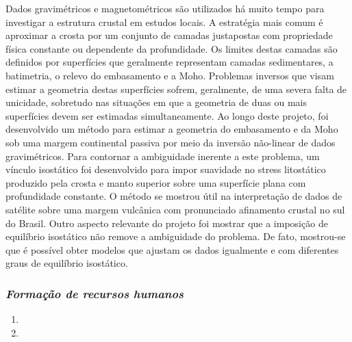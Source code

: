 Dados gravimétricos e magnetométricos são utilizados há muito tempo para investigar 
a estrutura crustal em estudos locais. A estratégia mais comum é aproximar a crosta por 
um conjunto de camadas justapostas com propriedade física constante ou dependente 
da profundidade. Os limites destas camadas são definidos por superfícies que geralmente 
representam camadas sedimentares, a batimetria, o relevo do embasamento e a Moho. 
Problemas inversos que visam estimar a geometria destas superfícies sofrem, geralmente, 
de uma severa falta de unicidade, sobretudo nas situações em que a geometria de duas 
ou mais superfícies devem ser estimadas simultaneamente. Ao longo deste projeto, 
foi desenvolvido um método para estimar a geometria do embasamento e da Moho sob  
uma margem continental passiva por meio da inversão não-linear de dados 
gravimétricos. Para contornar a ambiguidade inerente a este problema, um vínculo 
isostático foi desenvolvido para impor suavidade no stress litostático produzido pela 
crosta e manto superior sobre uma superfície plana com profundidade constante. 
O método se mostrou útil na interpretação de dados de satélite 
sobre uma margem vulcânica com pronunciado afinamento crustal no sul do Brasil. 
Outro aspecto relevante do projeto foi mostrar que a imposição de equilíbrio isostático 
não remove a ambiguidade do problema. De fato, mostrou-se que é possível obter modelos 
que ajustam os dados igualmente e com diferentes graus de equilíbrio isostático.


\subsubsection{\emph{Formação de recursos humanos}}

\begin{enumerate}
	
	\item{}
	
	\item{}
	
\end{enumerate}

